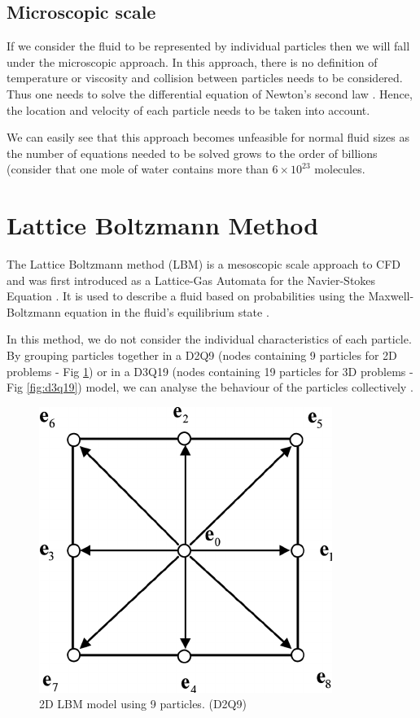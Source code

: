 \documentclass[12pt]{book}
\begin{document}
\subsection{Microscopic scale}
If we consider the fluid to be represented by individual particles then we will fall under the microscopic approach. In this approach, there is no definition of temperature or viscosity and collision between particles needs to be considered. Thus one needs to solve the differential equation of Newton’s second law \cite{lbm_springer}. Hence, the location and velocity of each particle needs to be taken into account.
	\par We can easily see that this approach becomes unfeasible for normal fluid sizes as the number of equations needed to be solved grows to the order of billions (consider that one mole of water contains more than $6 \times 10^{23}$ molecules.


\section{Lattice Boltzmann Method} \label{sec:lbmLit}
The Lattice Boltzmann method (LBM) is a mesoscopic scale approach to CFD and was first introduced as a Lattice-Gas Automata for the Navier-Stokes Equation \cite{gasautomata}. It is used to describe a fluid based on probabilities using the Maxwell-Boltzmann equation in the fluid’s equilibrium state \cite{lbm_springer}. 
\par In this method, we do not consider the individual characteristics of each particle. By grouping particles together in a D2Q9 (nodes containing 9 particles for 2D problems - Fig \ref{fig:d2q9})  or in a D3Q19 (nodes containing 19 particles for 3D problems - Fig \ref{fig:d3q19}) model, we can analyse the behaviour of the particles collectively  \cite{lbm_springer}. 

\begin{figure}[H]
\centering
  \includegraphics[width=0.3\linewidth]{Resources/Images/d2q9.png}
  \caption{2D LBM model using 9 particles. (D2Q9)}
  \label{fig:d2q9}
\end{figure}
\end{document}
